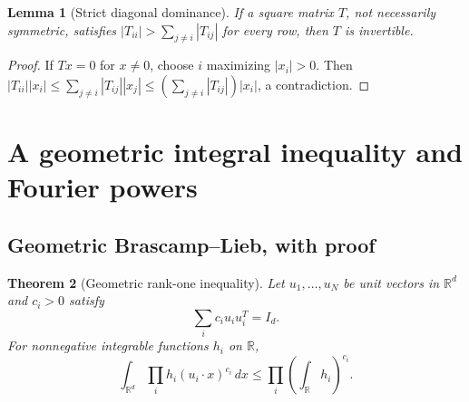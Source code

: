 \documentclass[11pt]{article}
\numberwithin{equation}{section}
\newtheorem{theorem}{Theorem}[section]
\newtheorem{lemma}[theorem]{Lemma}
\theoremstyle{definition}\newtheorem{definition}[theorem]{Definition}
\theoremstyle{remark}\newtheorem{remark}[theorem]{Remark}
\newcommand{\R}{\mathbb R}\newcommand{\E}{\mathbb E}\newcommand{\PP}{\mathbb P}
\newcommand{\1}{\mathbf 1}\newcommand{\diag}{\operatorname{diag}}
\begin{document}
\begin{lemma}[Strict diagonal dominance]\label{lem:dd}
If a square matrix $T$, not necessarily symmetric, satisfies
$|T_{ii}|>\sum_{j\ne i}|T_{ij}|$ for every row, then $T$ is invertible.
\end{lemma}
\begin{proof}
If $Tx=0$ for $x\ne0$, choose $i$ maximizing $|x_i|>0$. Then
$|T_{ii}||x_i|\le\sum_{j\ne i}|T_{ij}||x_j|\le(\sum_{j\ne i}|T_{ij}|)|x_i|$,
a contradiction.
\end{proof}

\section{A geometric integral inequality and Fourier powers}
\subsection{Geometric Brascamp--Lieb, with proof}
\begin{theorem}[Geometric rank-one inequality]\label{thm:bl}
Let $u_1,\ldots,u_N$ be unit vectors in $\R^d$ and $c_i>0$ satisfy
\begin{equation}\label{eq:frame}
 \sum_i c_i u_i u_i^T=I_d.
\end{equation}
For nonnegative integrable functions $h_i$ on $\R$,
\begin{equation}\label{eq:bl}
 \int_{\R^d}\prod_i h_i(u_i\cdot x)^{c_i}\,dx
 \le\prod_i\left(\int_\R h_i\right)^{c_i}.
\end{equation}
\end{theorem}
\end{document}

